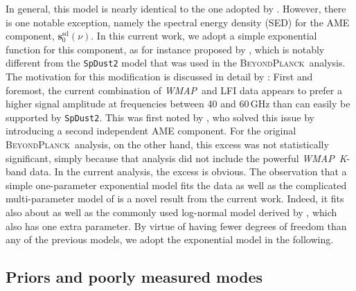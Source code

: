 \documentclass[twocolumn]{../../common/aa}
\def\WMAP{\emph{WMAP}}
\newcommand{\bp}{\textsc{BeyondPlanck}}
\newcommand{\K}[0]{\textit K}
\begin{document}
In general, this model is nearly identical to the one adopted by \citet{bp01}. However, there is one notable exception, namely the spectral energy density (SED) for the AME component, $\boldsymbol s_0^\mathrm{sd}(\nu)$. In this current work, we adopt a simple exponential function for this component, as for instance proposed by \citet{hensley:2015}, which is notably different from the \texttt{SpDust2} model \citep{ali-haimoud:2009, ali-haimoud:2010, silsbee:2011} that was used in the \bp\ analysis. The motivation for this modification is discussed in detail by \citet{watts2023_ame}: First and foremost, the current combination of \WMAP\ and LFI data appears to prefer a higher signal amplitude at frequencies between 40 and 60\,GHz than can easily be supported by \texttt{SpDust2}. This was first noted by \citet{planck2014-a11}, who solved this issue by introducing a second independent AME component. For the original \bp\ analysis, on the other hand, this excess was not statistically significant, simply because that analysis did not include the powerful \WMAP\ \K-band data. In the current analysis, the excess is obvious. The observation that a simple one-parameter exponential model fits the data as well as the complicated multi-parameter model of \citet{planck2014-a11} is a novel result from the current work. Indeed, it fits also about as well as the commonly used log-normal model derived by \citet{Stevenson_2014}, which also has one extra parameter. By virtue of having fewer degrees of freedom than any of the previous models, we adopt the exponential model in the following.


\subsection{Priors and poorly measured modes}
\label{sec:priors}
\end{document}
